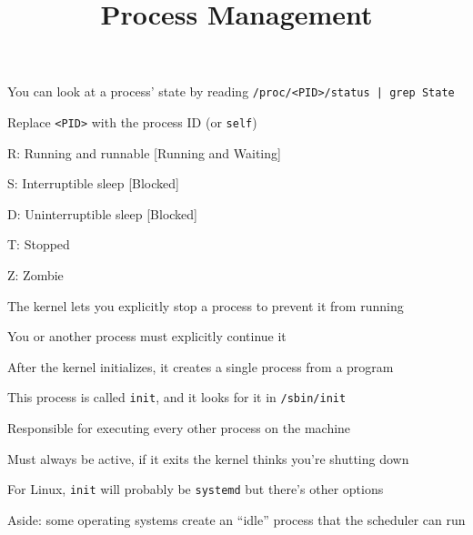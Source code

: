 

\title{Process Management}


  \begin{frame}
    \titlepage
  \end{frame}

  \begin{slide}


    You can look at a process' state by reading \texttt{/proc/<PID>/status | grep State}

    \leftspace{}Replace \texttt{<PID>} with the process ID (or \texttt{self})
    \bigskip

    R: Running and runnable [Running and Waiting]

    S: Interruptible sleep [Blocked]

    D: Uninterruptible sleep [Blocked]

    T: Stopped

    Z: Zombie
    \bigskip

    The kernel lets you explicitly stop a process to prevent it from running

    \leftspace{}You or another process must explicitly continue it

  \end{slide}

  \begin{slide}

    After the kernel initializes, it creates a single process
    from a program
    \bigskip


    This process is called \texttt{init}, and it looks for it in \texttt{/sbin/init}

    \leftspace{}Responsible for executing every other process on the machine

    \leftspace{}Must always be active, if it exits the kernel thinks you're shutting down
    \bigskip

    For Linux, \texttt{init} will probably be \texttt{systemd} but there's other options
    \bigskip

    Aside: some operating systems create an ``idle'' process that the
    scheduler can run
  \end{slide}

